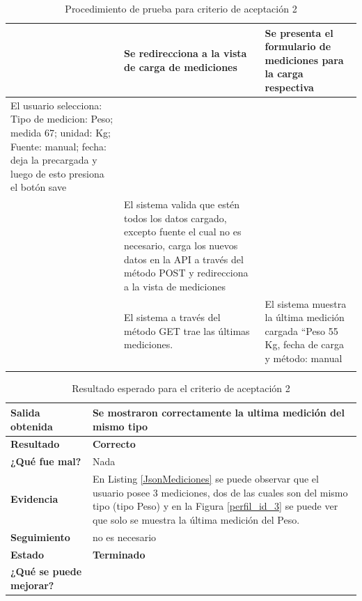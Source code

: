 \begin{longtable}{|p{5cm}|p{5cm}|p{4cm}|}
        & Se redirecciona a la vista de carga de mediciones&Se presenta el formulario de mediciones para la carga respectiva\\ \hline
        El usuario selecciona: Tipo de medicion: Peso; medida 67; unidad: Kg; Fuente: manual; fecha: deja la precargada y  luego de esto presiona el botón save& &\\ \hline       
        & El sistema valida que estén todos los datos cargado, excepto fuente el cual no es necesario, carga los nuevos datos en la API a través del método POST y redirecciona a la vista de mediciones&\\ \hline       
        &El sistema a través del método GET trae las últimas mediciones. &El sistema muestra la última medición cargada ``Peso 55 Kg, fecha de carga y método: manual\\ \hline
        \caption{Procedimiento de prueba para criterio de aceptación 2}
        
	    \end{longtable}
        
\clearpage

{\scriptsize
	\begin{table}[h]
	\centering
	\begin{tabular}{|l|p{10cm}|}
	    \hline 
	    \textbf{Salida obtenida}& Se mostraron correctamente la ultima medición del mismo tipo\\ \hline
	    \textbf{Resultado}& \textbf{Correcto}\\ \hline
        \textbf{¿Qué fue mal?}& Nada\\ \hline      
        \textbf{Evidencia}& En Listing \ref{JsonMediciones} se puede observar que el usuario posee 3 mediciones, dos de las cuales son del mismo tipo (tipo Peso) y en la Figura \ref{perfil_id_3} se puede ver que solo se muestra la última medición del Peso.  \\ \hline
        \textbf{Seguimiento}& no es necesario\\ \hline
        \textbf{Estado}& \textbf{Terminado}\\ \hline        
        \textbf{¿Qué se puede mejorar?}& \\ \hline              
	    \end{tabular}
        \caption{Resultado esperado para el criterio de aceptación 2}
    	\end{table}
	}


